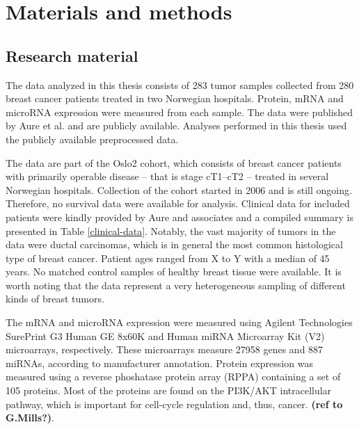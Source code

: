 

\section{Materials and methods}\label{materials-and-methods}

\subsection{Research material}

The data analyzed in this thesis consists of 283 tumor samples collected from
280 breast cancer patients treated in two Norwegian hospitals. Protein, mRNA
and microRNA expression were measured from each sample. The data were
published by Aure et al. \citep{Aure2015} and are publicly available. Analyses
performed in this thesis used the publicly available preprocessed data.

The data are part of the Oslo2 cohort, which consists of breast cancer
patients with primarily operable disease -- that is stage cT1--cT2 -- treated
in several Norwegian hospitals. Collection of the cohort started in 2006 and
is still ongoing. Therefore, no survival data were available for analysis.
Clinical data for included patients were kindly provided by Aure and
associates and a compiled summary is presented in Table
\ref{clinical-data}. Notably, the vast majority of tumors in the data
were ductal carcinomas, which is in general the most common histological type
of breast cancer. Patient ages ranged from X to Y with a median of 45 years.
No matched control samples of healthy breast tissue were available.
It is worth noting that the data represent a very heterogeneous sampling
of different kinds of breast tumors.



The mRNA and microRNA expression were measured using Agilent Technologies
SurePrint G3 Human GE 8x60K and Human miRNA Microarray Kit (V2) microarrays,
respectively. These microarrays measure 27958 genes and 887 miRNAs, according
to manufacturer annotation. Protein expression was measured using a reverse
phoshatase protein array (RPPA) containing a set of 105 proteins. Most of the
proteins are found on the PI3K/AKT intracellular pathway, which is important
for cell-cycle regulation and, thus, cancer. \textbf{(ref to G.Mills?)}.


